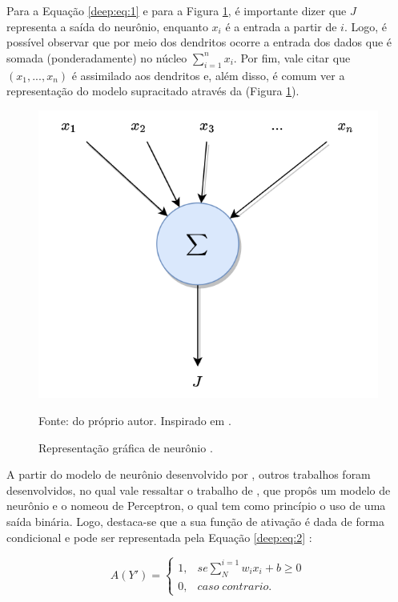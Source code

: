 Para a Equação \ref{deep:eq:1} e para a Figura \ref{deep:fig:2}, é importante dizer que $J$ representa a saída do neurônio, enquanto $x_i$ é a entrada a partir de $i$. Logo, é possível observar que por meio dos dendritos ocorre a entrada dos dados que é somada (ponderadamente) no núcleo $\sum_{i = 1}^{n} x_i$. Por fim, vale citar que $(x_1, ..., x_n)$ é assimilado aos dendritos e, além disso, é comum ver a representação do modelo supracitado através da (Figura \ref{deep:fig:2}).

\begin{figure}[H]
    \centering
    \caption{Representação gráfica de neurônio \cite{mcculloch1943logical}.}
    \includegraphics[width=1\linewidth]{recursos/imagens/deep/neuronio_mc.png}
    \label{deep:fig:2}

    Fonte: do próprio autor. Inspirado em \cite{mcculloch1943logical}.
\end{figure}

A partir do modelo de neurônio desenvolvido por \cite{mcculloch1943logical},  outros trabalhos foram desenvolvidos, no qual vale ressaltar o trabalho de \cite{Rosenblatt1958}, que propôs um modelo de neurônio e o nomeou de Perceptron, o qual tem como princípio o uso de uma saída binária. Logo, destaca-se que a sua função de ativação é dada de forma condicional e pode ser representada pela Equação \ref{deep:eq:2} \citep{Rosenblatt1958}:

\begin{equation}
    \label{deep:eq:2}
    A(Y') = \left\{\begin{matrix}
     1,& se \sum_{N}^{i=1} w_i x_i + b \geq 0 \\ 
     0,& caso \;  contrario.
    \end{matrix}\right.
\end{equation}

